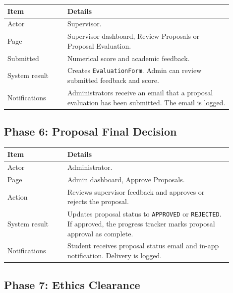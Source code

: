 \documentclass[11pt,a4paper]{article}
\newcommand{\status}[1]{\texttt{#1}}
\newcommand{\code}[1]{\texttt{#1}}
\begin{document}
\begin{longtable}{p{0.24\linewidth} p{0.66\linewidth}}
\toprule
\textbf{Item} & \textbf{Details} \\
\midrule
Actor & Supervisor. \\
Page & Supervisor dashboard, Review Proposals or Proposal Evaluation. \\
Submitted & Numerical score and academic feedback. \\
System result & Creates \code{EvaluationForm}. Admin can review submitted feedback and score. \\
Notifications & Administrators receive an email that a proposal evaluation has been submitted. The email is logged. \\
\bottomrule
\end{longtable}

\subsection{Phase 6: Proposal Final Decision}

\begin{longtable}{p{0.24\linewidth} p{0.66\linewidth}}
\toprule
\textbf{Item} & \textbf{Details} \\
\midrule
Actor & Administrator. \\
Page & Admin dashboard, Approve Proposals. \\
Action & Reviews supervisor feedback and approves or rejects the proposal. \\
System result & Updates proposal status to \status{APPROVED} or \status{REJECTED}. If approved, the progress tracker marks proposal approval as complete. \\
Notifications & Student receives proposal status email and in-app notification. Delivery is logged. \\
\bottomrule
\end{longtable}

\newpage

\subsection{Phase 7: Ethics Clearance}
\end{document}
